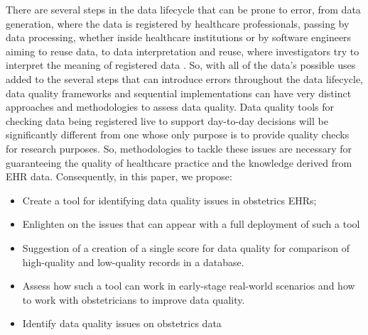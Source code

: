 There are several steps in the data lifecycle that can be prone to error, from data generation, where the data is registered by healthcare professionals, passing by data processing, whether inside healthcare institutions or by software engineers aiming to reuse data, to data interpretation and reuse, where investigators try to interpret the meaning of registered data \cite{wengClinicalDataQuality2020}.
So, with all of the data's possible uses added to the several steps that can introduce errors throughout the data lifecycle, data quality frameworks and sequential implementations can have very distinct approaches and methodologies to assess data quality. Data quality tools for checking data being registered live to support day-to-day decisions will be significantly different from one whose only purpose is to provide quality checks for research purposes. So, methodologies to tackle these issues are necessary for guaranteeing the quality of healthcare practice and the knowledge derived from EHR data. Consequently, in this paper, we propose:
\begin{itemize}
    \item Create a tool for identifying data quality issues in obstetrics EHRs;
    \item Enlighten on the issues that can appear with a full deployment of such a tool
    \item Suggestion of a creation of a single score for data quality for comparison of high-quality and low-quality records in a database.
    \item Assess how such a tool can work in early-stage real-world scenarios and how to work with obstetricians to improve data quality.
    \item Identify data quality issues on obstetrics data
\end{itemize}




